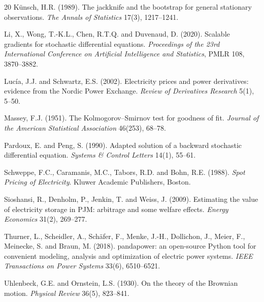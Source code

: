 \documentclass[11pt]{article}
\begin{document}
\begin{thebibliography}{20}
 K\"unsch, H.R. (1989).
The jackknife and the bootstrap for general stationary observations.
\emph{The Annals of Statistics} 17(3), 1217--1241.

 Li, X., Wong, T.-K.L., Chen, R.T.Q. and Duvenaud, D.
(2020). Scalable gradients for stochastic differential equations.
\emph{Proceedings of the 23rd International Conference on Artificial
Intelligence and Statistics}, PMLR 108, 3870--3882.

 Luc\'ia, J.J. and Schwartz, E.S. (2002).
Electricity prices and power derivatives: evidence from the Nordic Power
Exchange. \emph{Review of Derivatives Research} 5(1), 5--50.

 Massey, F.J. (1951).
The Kolmogorov--Smirnov test for goodness of fit.
\emph{Journal of the American Statistical Association} 46(253), 68--78.

 Pardoux, E. and Peng, S. (1990).
Adapted solution of a backward stochastic differential equation.
\emph{Systems \& Control Letters} 14(1), 55--61.

 Schweppe, F.C., Caramanis, M.C., Tabors, R.D. and
Bohn, R.E. (1988). \emph{Spot Pricing of Electricity}. Kluwer Academic
Publishers, Boston.

 Sioshansi, R., Denholm, P., Jenkin, T. and Weiss,
J. (2009). Estimating the value of electricity storage in PJM: arbitrage
and some welfare effects. \emph{Energy Economics} 31(2), 269--277.

 Thurner, L., Scheidler, A., Sch\"afer, F.,
Menke, J.-H., Dollichon, J., Meier, F., Meinecke, S. and Braun, M. (2018).
pandapower: an open-source Python tool for convenient modeling, analysis
and optimization of electric power systems. \emph{IEEE Transactions on
Power Systems} 33(6), 6510--6521.

 Uhlenbeck, G.E. and Ornstein, L.S. (1930).
On the theory of the Brownian motion. \emph{Physical Review} 36(5),
823--841.

\end{thebibliography}
\end{document}
